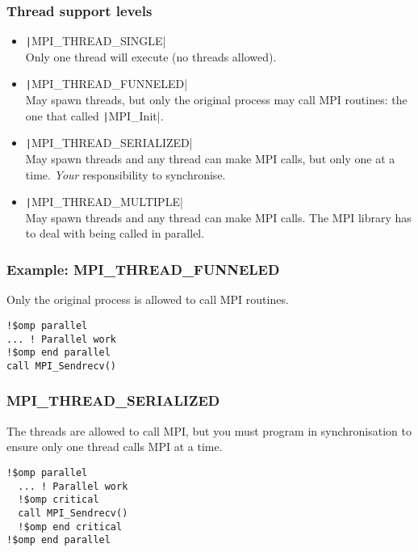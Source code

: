 \documentclass{beamer}
\begin{document}
\begin{frame}
\frametitle{Thread support levels}
\begin{itemize}
  \item \texttt|MPI_THREAD_SINGLE| \\
  Only one thread will execute (no threads allowed).

  \item \texttt|MPI_THREAD_FUNNELED| \\
  May spawn threads, but only the original process may call MPI routines: the one that called \texttt|MPI_Init|.

  \item \texttt|MPI_THREAD_SERIALIZED| \\
  May spawn threads and any thread can make MPI calls, but only one at a time. \emph{Your} responsibility to synchronise.

  \item \texttt|MPI_THREAD_MULTIPLE| \\
  May spawn threads and any thread can make MPI calls. The MPI library has to deal with being called in parallel.
\end{itemize}

\end{frame}

\begin{frame}[fragile]
\frametitle{Example: MPI\_THREAD\_FUNNELED}
Only the original process is allowed to call MPI routines.
\begin{verbatim}
!$omp parallel
... ! Parallel work
!$omp end parallel
call MPI_Sendrecv()
\end{verbatim}
\end{frame}

\begin{frame}[fragile]
\frametitle{MPI\_THREAD\_SERIALIZED}
The threads are allowed to call MPI, but you must program in synchronisation to ensure only one thread calls MPI at a time.
\begin{verbatim}
!$omp parallel
  ... ! Parallel work
  !$omp critical
  call MPI_Sendrecv()
  !$omp end critical
!$omp end parallel
\end{verbatim}
\end{frame}
\end{document}
